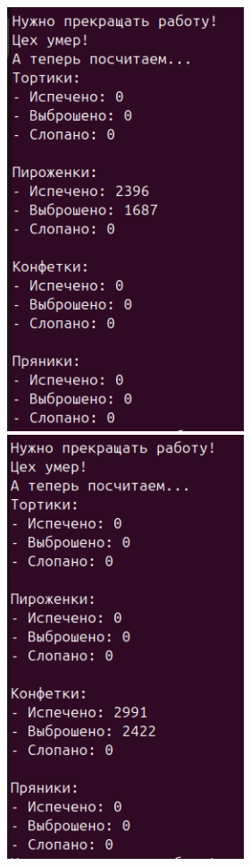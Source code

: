 \documentclass[a4paper,14pt]{extarticle}
\begin{document}
\includegraphics[width=70mm]{processes_output_4_2}
\includegraphics[width=70mm]{processes_output_4_3}
\end{document}
